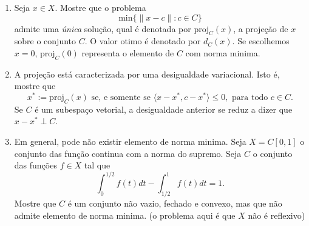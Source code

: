 \documentclass[a4paper,latin]{article}
\begin{document}
\begin{enumerate}
\begin{enumerate}
     \item Seja $x \in X$. Mostre que o problema 
     $$\text{min} \{\|x-c\|: c \in C\}$$
     admite uma {\it única} solução, qual é denotada por $\text{proj}_{C}(x)$, a projeção de $x$ sobre o conjunto $C$. 
     O valor otimo é denotado por $d_{C}(x)$.
     Se escolhemos $x=0$, 
     $\text{proj}_{C}(0)$
     representa o elemento de $C$ com norma minima. %
     \item A projeção está caracterizada por uma desigualdade variacional. Isto é, mostre que 
     $$ 
     x^{*}:= \text{proj}_{C}(x)
     \text{ se, e somente se } 
     \langle x-x^*, c-x^*\rangle \leq 0,
     \text{ para todo } 
     c \in C
     .$$
     Se $C$ é um subespaço vetorial, a desigualdade anterior se reduz a dizer que $x-x^* \perp C$. 
     \item Em general, pode não existir elemento de norma minima. 
     Seja $X=C[0,1]$ o conjunto das função continua com a norma do supremo. 
     Seja $C$ o conjunto das funções 
     $f \in X$
     tal que 
     $$ \int_{0}^{1/2} f(t)dt-\int_{1/2}^{1} f(t)dt=1.$$
     Mostre que $C$ é um conjunto não vazio, fechado e convexo, mas que não admite elemento de norma minima.
     (o problema aqui é que $X$ não é reflexivo)
     \end{enumerate}   
   \end{enumerate}    
\end{document}
